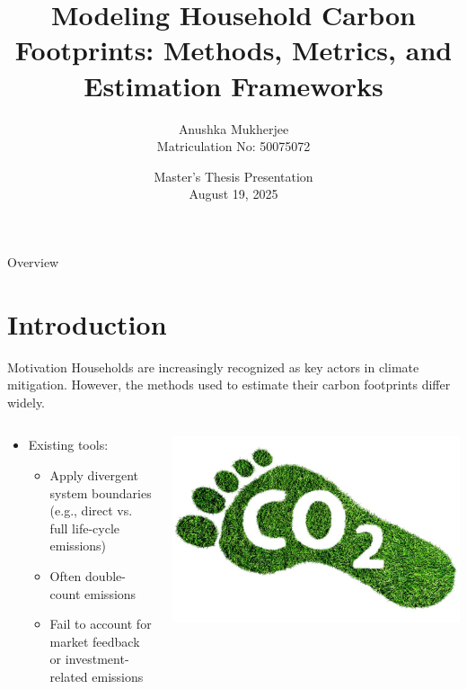 \documentclass{beamer}
\title[Modeling Household Carbon Footprints]{Modeling Household Carbon Footprints: Methods, Metrics, and Estimation Frameworks}
\author[Anushka Mukherjee]{Anushka Mukherjee\\Matriculation No: 50075072}
\institute[University of Bonn]{University of Bonn}
\date[July 2025]{Master's Thesis Presentation\\August 19, 2025}
\begin{document}
\begin{frame}
  \titlepage
\end{frame}

\begin{frame}{Overview}
  \tableofcontents
\end{frame}

\section{Introduction}
\begin{frame}{Motivation}
\vspace{-1.5em}
\small
Households are increasingly recognized as key actors in climate mitigation. However, the methods used to estimate their carbon footprints differ widely.

\begin{columns}
  \begin{column}{0.65\textwidth}
    \begin{itemize}
      \item Existing tools:
      \begin{itemize}
        \item Apply divergent system boundaries  (e.g., direct vs. full life-cycle emissions)
        \item Often double-count emissions 
        \item Fail to account for market feedback or investment-related emissions
      \end{itemize}
    \end{itemize}
  \end{column}
  \begin{column}{0.2\textwidth}
    \includegraphics[width=\linewidth]{co2.jpg}
  \end{column}
\end{columns}


\end{frame}
\end{document}
